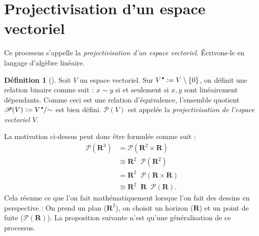 \documentclass[12pt, oneside]{memoir}
\theoremstyle{definition}
\newtheorem{defn}{Définition}
\theoremstyle{remark}
\newcommand{\unbutton}[1][.6]{\mathbin{\hspace{1pt}\vcenter{\hbox{\scalebox{#1}{$\bullet$}}}}}
\newcommand{\defeq}{\vcentcolon=}
\newcommand{\set}[1]{\{ #1 \}}
\newcommand{\proj}{\boldsymbol{\mathscr{P}}}
\newcommand{\discup}{\mathop{\dot{\cup}}}
\newcommand{\R}{\mathbf{R}}
\begin{document}
\section{Projectivisation d'un espace vectoriel}
Ce processus s'appelle la \textit{projectivisation d'un espace
  vectoriel}. Écrivons-le en langage d'algèbre linéaire.
\begin{defn}[{\cite[27]{ff00}}]
  \label{projectivization}
  Soit $V$ un espace vectoriel. Sur
  $V^{\unbutton} \defeq V \setminus \set{0}$, on définit une relation
  binaire comme suit : $x \sim y$ si et seulement si $x, y$ sont
  linéairement dépendants. Comme ceci est une relation
  d'équivalence, l'ensemble quotient
  $\proj(V) \defeq V^{\unbutton} / {\sim}$ est bien défini. $\proj(V)$
  est appelée la \textit{projectivisation de l'espace vectoriel $V$}.
\end{defn}
La motivation ci-dessus peut donc être formulée comme suit :
\begin{align*}
  \label{eq:embedding}
  \proj(\R^3) &= \proj(\R^2 \times \R) \\
              &\cong \R^2 \discup \proj(\R^2) \\
              &= \R^2 \discup \proj(\R \times \R) \\
              &\cong \R^2 \discup \R \discup \proj(\R).
\end{align*}
Cela résume ce que l'on fait mathématiquement lorsque l'on fait des
dessins en perspective : On prend un plan ($\R^2$), on choisit un
horizon ($\R$) et un point de fuite ($\proj(\R)$). La proposition
suivante n'est qu'une généralisation de ce processus.
\end{document}
